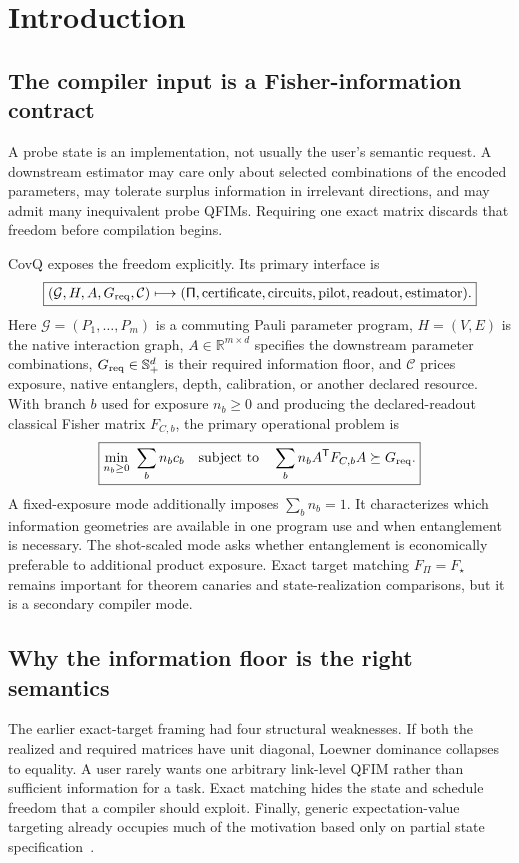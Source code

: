 \documentclass[11pt]{article}
\theoremstyle{definition}
\theoremstyle{remark}
\newcommand{\R}{\mathbb{R}}
\newcommand{\G}{\mathcal{G}}
\newcommand{\PiProg}{\mathsf{\Pi}}
\begin{document}
\tableofcontents
\clearpage

\section{Introduction}

\subsection{The compiler input is a Fisher-information contract}
A probe state is an implementation, not usually the user's semantic request. A downstream estimator may care only about selected combinations of the encoded parameters, may tolerate surplus information in irrelevant directions, and may admit many inequivalent probe QFIMs. Requiring one exact matrix discards that freedom before compilation begins.

CovQ exposes the freedom explicitly. Its primary interface is
\begin{equation}
\boxed{
  (\G,H,A,G_{\rm req},\mathcal C)
  \longmapsto
  (\PiProg,\text{certificate},\text{circuits},\text{pilot},\text{readout},\text{estimator}) .}
  \label{eq:compiler-map}
\end{equation}
Here $\G=(P_1,\ldots,P_m)$ is a commuting Pauli parameter program, $H=(V,E)$ is the native interaction graph, $A\in\R^{m\times d}$ specifies the downstream parameter combinations, $G_{\rm req}\in\mathbb S_+^d$ is their required information floor, and $\mathcal C$ prices exposure, native entanglers, depth, calibration, or another declared resource. With branch $b$ used for exposure $n_b\ge0$ and producing the declared-readout classical Fisher matrix $F_{C,b}$, the primary operational problem is
\begin{equation}
\boxed{
  \min_{n_b\ge0}\ \sum_b n_b c_b
  \quad\text{subject to}\quad
  \sum_b n_b A^{\mathsf T}F_{C,b}A\succeq G_{\rm req}.}
  \label{eq:main-compiler-problem}
\end{equation}
A fixed-exposure mode additionally imposes $\sum_b n_b=1$. It characterizes which information geometries are available in one program use and when entanglement is necessary. The shot-scaled mode asks whether entanglement is economically preferable to additional product exposure. Exact target matching $F_{\PiProg}=F_\star$ remains important for theorem canaries and state-realization comparisons, but it is a secondary compiler mode.

\subsection{Why the information floor is the right semantics}
The earlier exact-target framing had four structural weaknesses. If both the realized and required matrices have unit diagonal, Loewner dominance collapses to equality. A user rarely wants one arbitrary link-level QFIM rather than sufficient information for a task. Exact matching hides the state and schedule freedom that a compiler should exploit. Finally, generic expectation-value targeting already occupies much of the motivation based only on partial state specification~\cite{MahapatraKadiri2026}.
\end{document}
